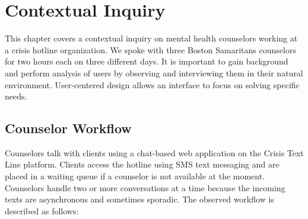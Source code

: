 \chapter{Contextual Inquiry}

This chapter covers a contextual inquiry \cite{contextual-design} on mental health counselors working at a
crisis hotline organization. We spoke with three Boston Samaritans counselors for two
hours each on three different days. It is important to gain background and perform
analysis of users by observing and interviewing them in their natural environment.
User-centered design allows an interface to focus on solving specific needs.

\section{Counselor Workflow}

Counselors talk with clients using a chat-based web application on the Crisis Text
Line platform. Clients access the hotline using SMS text messaging and are placed
in a waiting queue if a counselor is not available at the moment. Counselors handle
two or more conversations at a time because the incoming texts are asynchronous
and sometimes sporadic. The observed workflow is described as follows:

